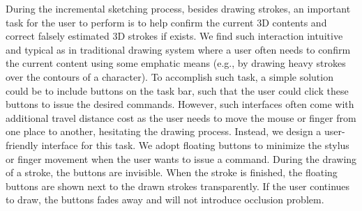 During the incremental sketching process, besides drawing strokes, an important task for the user to perform is to help confirm the current 3{D} contents and correct falsely estimated 3{D} strokes if exists. We find such interaction intuitive and typical as in traditional drawing system where a user often needs to confirm the current content using some emphatic means (e.g., by drawing heavy strokes over the contours of a character). To accomplish such task, a simple solution could be to include buttons on the task bar, such that the user could click these buttons to issue the desired commands. However, such interfaces often come with additional travel distance cost as the user needs to move the mouse or finger from one place to another, hesitating the drawing process. Instead, we design a user-friendly interface for this task. We adopt floating buttons to minimize the stylus or finger movement when the user wants to issue a command. During the drawing of a stroke, the buttons are invisible. When the stroke is finished, the floating buttons are shown next to the drawn strokes transparently. If the user continues to draw, the buttons fades away and will not introduce occlusion problem.














